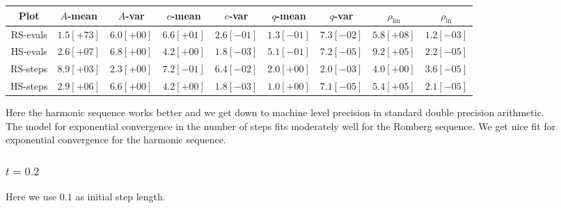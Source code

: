 \begin{table}[H]
    \centering\small
    \begin{tabular}{c||c|c|c|c|c|c|c|c}
Plot & \(A\)-mean & \(A\)-var & \(c\)-mean & \(c\)-var & \(q\)-mean & \(q\)-var & \(\rho_{\operatorname{lin}}\) & \(\rho_{\ln}\)\\\hline
\rowcolor{red}
RS-evals & \(1.5[+73]\) & \(6.0[+00]\) & \(6.6[+01]\) & \(2.6[-01]\) & \(1.3[-01]\) & \(7.3[-02]\) & \(5.8[+08]\) & \(1.2[-03]\) \\
\rowcolor{green}
HS-evals & \(2.6[+07]\) & \(6.8[+00]\) & \(4.2[+00]\) & \(1.8[-03]\) & \(5.1[-01]\) & \(7.2[-05]\) & \(9.2[+05]\) & \(2.2[-05]\) \\
\rowcolor{green}
RS-steps & \(8.9[+03]\) & \(2.3[+00]\) & \(7.2[-01]\) & \(6.4[-02]\) & \(2.0[+00]\) & \(2.0[-03]\) & \(4.0[+00]\) & \(3.6[-05]\) \\
\rowcolor{green}
HS-steps & \(2.9[+06]\) & \(6.6[+00]\) & \(4.2[+00]\) & \(1.8[-03]\) & \(1.0[+00]\) & \(7.1[-05]\) & \(5.4[+05]\) & \(2.1[-05]\) \\
    \end{tabular}
    \label{tab:my_label}
\end{table}

Here the harmonic sequence works better and we get down to machine level precision in standard double precision arithmetic.\\

The model for exponential convergence in the number of steps fits moderately well for the Romberg sequence. We get nice fit for exponential convergence for the harmonic sequence.

\subsubsection{\(t = 0.2\)}

Here we use \(0.1\) as initial step length. 


